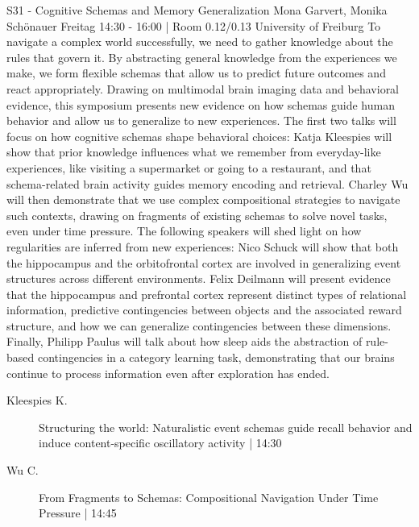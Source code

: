 
            \begin{symposium}
            {S31 - Cognitive Schemas and Memory Generalization}
            {Mona Garvert, Monika Schönauer}
            {Freitag 14:30 - 16:00 | Room 0.12/0.13}
            {University of Freiburg}
            To navigate a complex world successfully, we need to gather knowledge about the rules that govern it. By abstracting general knowledge from the experiences we make, we form flexible schemas that allow us to predict future outcomes and react appropriately. Drawing on multimodal brain imaging data and behavioral evidence, this symposium presents new evidence on how schemas guide human behavior and allow us to generalize to new experiences. The first two talks will focus on how cognitive schemas shape behavioral choices: Katja Kleespies will show that prior knowledge influences what we remember from everyday-like experiences, like visiting a supermarket or going to a restaurant, and that schema-related brain activity guides memory encoding and retrieval. Charley Wu will then demonstrate that we use complex compositional strategies to navigate such contexts, drawing on fragments of existing schemas to solve novel tasks, even under time pressure. The following speakers will shed light on how regularities are inferred from new experiences: Nico Schuck will show that both the hippocampus and the orbitofrontal cortex are involved in generalizing event structures across different environments. Felix Deilmann will present evidence that the hippocampus and prefrontal cortex represent distinct types of relational information, predictive contingencies between objects and the associated reward structure, and how we can generalize contingencies between these dimensions. Finally, Philipp Paulus will talk about how sleep aids the abstraction of rule-based contingencies in a category learning task, demonstrating that our brains continue to process information even after exploration has ended.
            \begin{description}    
            
                \item [ Kleespies K.] Structuring the world: Naturalistic event schemas guide recall behavior and induce content-specific oscillatory activity \textcolor{mygray}{ | 14:30}    
                
                \item [ Wu C.] From Fragments to Schemas: Compositional Navigation Under Time Pressure \textcolor{mygray}{ | 14:45}    
                

\end{description}
\end{symposium}
